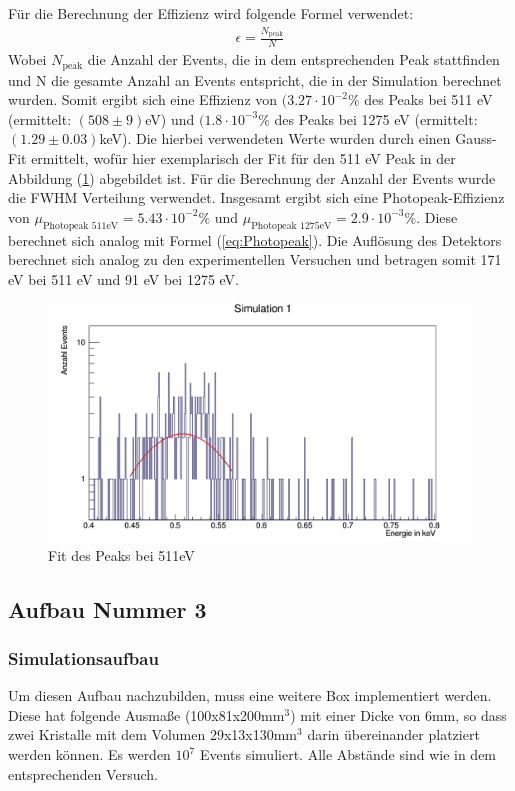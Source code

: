 \documentclass[a4paper,14pt,twoside]{article}
\begin{document}
Für die Berechnung der Effizienz wird folgende Formel verwendet:
\begin{align}
	\epsilon = \frac{N_{\textrm{peak}}}{N}
\end{align}
Wobei $N_\textrm{peak}$ die Anzahl der Events, die in dem entsprechenden Peak stattfinden und N die gesamte Anzahl an Events entspricht, die in der Simulation berechnet wurden. Somit ergibt sich eine Effizienz von $(3.27\cdot 10^{-2}\%$ des Peaks bei 511 eV (ermittelt: $(508\pm 9)$eV)  und $(1.8\cdot 10^{-3}\%$ des Peaks bei 1275 eV (ermittelt: $(1.29\pm 0.03)$keV). Die hierbei verwendeten Werte wurden durch einen Gauss-Fit ermittelt, wofür hier exemplarisch der Fit für den 511 eV Peak in der Abbildung (\ref{S1_511_fit}) abgebildet ist. Für die Berechnung der Anzahl der Events wurde die FWHM Verteilung verwendet. Insgesamt ergibt sich eine Photopeak-Effizienz von $\mu_\textrm{Photopeak 511eV}=5.43\cdot 10^{-2} \% $ und $\mu_\textrm{Photopeak 1275eV}=2.9\cdot 10^{-3} \% $. Diese berechnet sich analog mit Formel (\ref{eq:Photopeak}). Die Auflösung des Detektors berechnet sich analog zu den experimentellen Versuchen und betragen somit 171 eV bei 511 eV und 91 eV bei 1275 eV.
		
\begin{figure}[H]
	\begin{center}
		\includegraphics[width=0.7\linewidth]{Simulation1_511_fit}
		\caption{Fit des Peaks bei 511eV}
		\label{S1_511_fit}
	\end{center}
\end{figure}		
		
		
		
	\subsection{Aufbau Nummer 3}
		\subsubsection{Simulationsaufbau}
			Um diesen Aufbau nachzubilden, muss eine weitere Box implementiert werden. Diese hat folgende Ausmaße (100x81x200mm$^3$) mit einer Dicke von 6mm, so dass zwei Kristalle mit dem Volumen 29x13x130mm$^3$ darin übereinander platziert werden können. Es werden $10^7$ Events simuliert. Alle Abstände sind wie in dem entsprechenden Versuch. 
			
\end{document}
